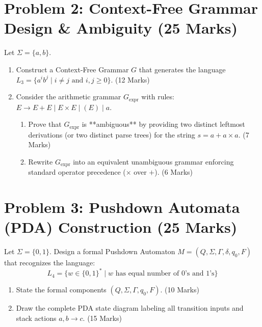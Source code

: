 \documentclass[11pt,a4paper]{article}
\begin{document}
\section*{Problem 2: Context-Free Grammar Design \& Ambiguity (25 Marks)}
Let $\Sigma = \{a, b\}$.
\begin{enumerate}[label=\textbf{(\alph*)}]
    \item Construct a Context-Free Grammar $G$ that generates the language $L_3 = \{a^i b^j \mid i \neq j \text{ and } i, j \ge 0\}$. (12 Marks)
    \item Consider the arithmetic grammar $G_{\text{expr}}$ with rules: $E \to E + E \mid E \times E \mid (E) \mid a$.
    \begin{enumerate}[label=\textbf{(\roman*)}]
        \item Prove that $G_{\text{expr}}$ is **ambiguous** by providing two distinct leftmost derivations (or two distinct parse trees) for the string $s = a + a \times a$. (7 Marks)
        \item Rewrite $G_{\text{expr}}$ into an equivalent unambiguous grammar enforcing standard operator precedence ($\times$ over $+$). (6 Marks)
    \end{enumerate}
\end{enumerate}

\vspace{8pt}

\section*{Problem 3: Pushdown Automata (PDA) Construction (25 Marks)}
Let $\Sigma = \{0, 1\}$. Design a formal Pushdown Automaton $M = (Q, \Sigma, \Gamma, \delta, q_0, F)$ that recognizes the language:
$$L_4 = \{w \in \{0, 1\}^* \mid w \text{ has equal number of } 0\text{'s and } 1\text{'s}\}$$
\begin{enumerate}[label=\textbf{(\alph*)}]
    \item State the formal components $(Q, \Sigma, \Gamma, q_0, F)$. (10 Marks)
    \item Draw the complete PDA state diagram labeling all transition inputs and stack actions $a, b \to c$. (15 Marks)
\end{enumerate}

\vspace{8pt}
\end{document}
